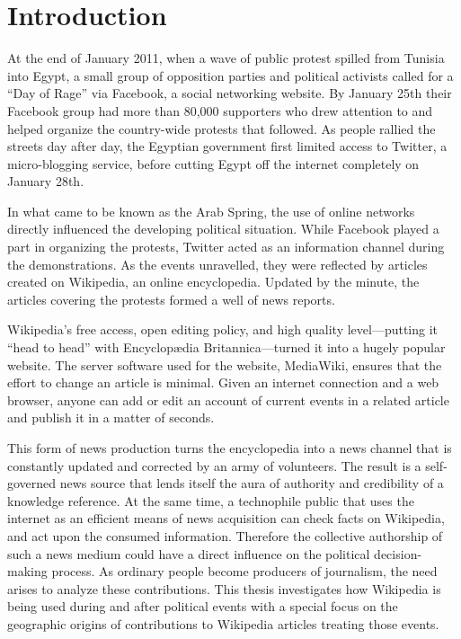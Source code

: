 \chapter{Introduction}\label{ch:introduction}


At the end of January 2011, when a wave of public protest spilled from Tunisia into Egypt, a small group of opposition parties and political activists called for a ``Day of Rage'' via Facebook, a social networking website.
By January 25th their Facebook group had more than 80,000 supporters who drew attention to and helped organize the country-wide protests that followed. 
As people rallied the streets day after day, the Egyptian government first limited access to Twitter, a micro-blogging service, before cutting Egypt off the internet completely on January 28th.\cite{econ18013760, szegypt}

In what came to be known as the Arab Spring, the use of online networks directly influenced the  developing political situation.
While Facebook played a part in organizing the protests, Twitter acted as an information channel during the demonstrations.
As the events unravelled, they were reflected by articles created on Wikipedia, an online encyclopedia.
Updated by the minute, the articles covering the protests formed a well of news reports.\cite{wikiegypt}

Wikipedia's free access, open editing policy, and high quality level---putting it ``head to head''\cite{giles2005internet} with Encyclopædia Britan\-nica---turned it into a hugely popular website\cite{wikipv}.
The server software used for the website, MediaWiki, ensures that the effort to change an article is minimal.
Given an internet connection and a web browser, anyone can add or edit an account of current events in a related article and publish it in a matter of seconds.

This form of news production turns the encyclopedia into a news channel that is constantly updated and corrected by an army of volunteers.
The result is a self-governed news source that lends itself the aura of authority and credibility of a knowledge reference.
At the same time, a technophile public that uses the internet as an efficient means of news acquisition can check facts on Wikipedia, and act upon the consumed information.\cite[p. 424--427]{chadwick2009routledge}
Therefore the collective authorship of such a news medium could have a direct influence on the political decision-making process.
As ordinary people become producers of journalism, the need arises to analyze these contributions. 
This thesis investigates  how Wikipedia is being used during and after political events with a special focus on the geographic origins of contributions to Wikipedia articles treating those events.

